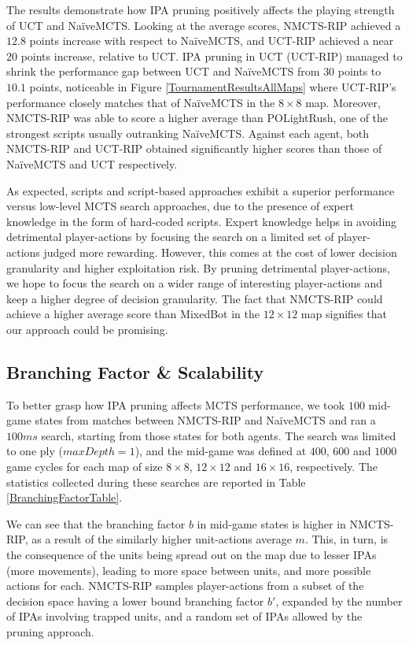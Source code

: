 \documentclass[conference]{IEEEtran}
\begin{document}
The results demonstrate how IPA pruning positively affects the playing strength of UCT and NaïveMCTS. Looking at the average scores, NMCTS-RIP achieved a $12.8$ points increase with respect to NaïveMCTS, and UCT-RIP achieved a near $20$ points increase, relative to UCT. IPA pruning in UCT (UCT-RIP) managed to shrink the performance gap between UCT and NaïveMCTS from $30$ points to $10.1$ points, noticeable in Figure \ref{TournamentResultsAllMaps} where UCT-RIP's performance closely matches that of NaïveMCTS in the $8\times8$ map. Moreover, NMCTS-RIP was able to score a higher average than POLightRush, one of the strongest scripts usually outranking NaïveMCTS. Against each agent, both NMCTS-RIP and UCT-RIP obtained significantly higher scores than those of NaïveMCTS and UCT respectively.

As expected, scripts and script-based approaches exhibit a superior performance versus low-level MCTS search approaches, due to the presence of expert knowledge in the form of hard-coded scripts. Expert knowledge helps in avoiding detrimental player-actions by focusing the search on a limited set of player-actions judged more rewarding. However, this comes at the cost of lower decision granularity and higher exploitation risk. By pruning detrimental player-actions, we hope to focus the search on a wider range of interesting player-actions and keep a higher degree of decision granularity. The fact that NMCTS-RIP could achieve a higher average score than MixedBot in the $12\times12$ map signifies that our approach could be promising.


\subsection{Branching Factor \& Scalability}

To better grasp how IPA pruning affects MCTS performance, we took $100$ mid-game states from matches between NMCTS-RIP and NaïveMCTS and ran a $100ms$ search, starting from those states for both agents. The search was limited to one ply ($maxDepth=1$), and the mid-game was defined at $400$, $600$ and $1000$ game cycles for each map of size $8\times8$, $12\times12$ and $16\times16$, respectively. The statistics collected during these searches are reported in Table \ref{BranchingFactorTable}.

We can see that the branching factor $b$ in mid-game states is higher in NMCTS-RIP, as a result of the similarly higher unit-actions average $m$. This, in turn, is the consequence of the units being spread out on the map due to lesser IPAs (more movements), leading to more space between units, and more possible actions for each. NMCTS-RIP samples player-actions from a subset of the decision space having a lower bound branching factor $b'$, expanded by the number of IPAs involving trapped units, and a random set of IPAs allowed by the pruning approach.
\end{document}
